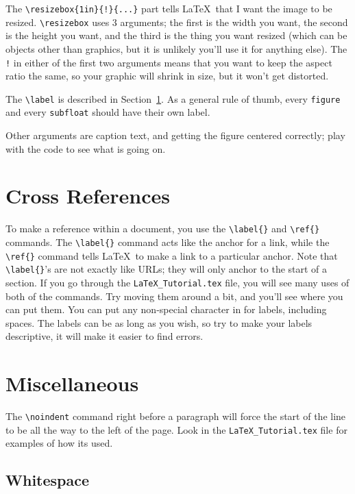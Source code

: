 \documentclass[letterpaper]{article}
\begin{document}
The \verb+\resizebox{1in}{!}{...}+ part tells \LaTeX\ that I want the 
image to be resized.  \verb+\resizebox+ uses 3 arguments; the first is 
the width you want, the second is the height you want, and the third is 
the thing you want resized (which can be objects other than graphics, 
but it is unlikely you'll use it for anything else).  The \verb+!+ in either 
of the first two arguments means that you want to keep the aspect ratio 
the same, so your graphic will shrink in size, but it won't get 
distorted.

The \verb+\label+ is described in Section~\ref{Cross References}.  As a 
general rule of thumb, every \verb+figure+ and every \verb+subfloat+ 
should have their own label.

Other arguments are caption text, and getting the figure centered 
correctly; play with the code to see what is going on.

\section{Cross References}
\label{Cross References}

To make a reference within a document, you use the \verb+\label{}+ and 
\verb+\ref{}+ commands.  The \verb+\label{}+ command acts like the 
anchor for a link, while the \verb+\ref{}+ command tells \LaTeX\ to make 
a link to a particular anchor.  Note that \verb+\label{}+'s are not 
exactly like URLs; they will only anchor to the start of a section.  If 
you go through the \texttt{LaTeX\_Tutorial.tex} file, you will see many 
uses of both of the commands.  Try moving them around a bit, and you'll 
see where you can put them.  You can put any non-special character in 
for labels, including spaces.  The labels can be as long as you wish, so try 
to make your labels descriptive, it will make it easier to find errors.

\section{Miscellaneous}
\label{Miscellaneous}

The \verb+\noindent+ command right before a paragraph will force the 
start of the line to be all the way to the left of the page.  Look in the
\texttt{LaTeX\_Tutorial.tex} file for examples of how its used.

\subsection{Whitespace}
\label{Whitespace}
\end{document}
